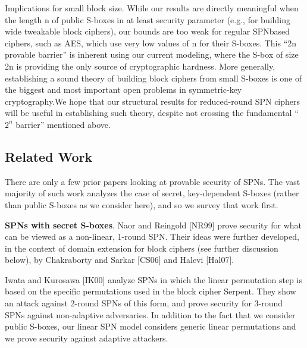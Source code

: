 Implications for small block size. While our results are directly meaningful
when the length n of public S-boxes in at least security parameter (e.g., for
building wide tweakable block ciphers), our bounds are too weak for regular SPNbased
ciphers, such as AES, which use very low values of n for their S-boxes.
This “2n provable barrier” is inherent using our current modeling, where the
S-box of size 2n is providing the only source of cryptographic hardness. More
generally, establishing a sound theory of building block ciphers from small S-boxes is one of the biggest and most important open problems in symmetric-key
cryptography.We hope that our structural results for reduced-round SPN ciphers
will be useful in establishing such theory, despite not crossing the fundamental
``$2^n$ barrier'' mentioned above.




%
%
%




\subsection{Related Work}


There are only a few prior papers looking at provable security of SPNs. The vast
majority of such work analyzes the case of secret, key-dependent S-boxes (rather
than public S-boxes as we consider here), and so we survey that work first.



{\bf SPNs with secret S-boxes}. Naor and Reingold [NR99] prove security for
what can be viewed as a non-linear, 1-round SPN. Their ideas were further
developed, in the context of domain extension for block ciphers (see further
discussion below), by Chakraborty and Sarkar [CS06] and Halevi [Hal07].


Iwata and Kurosawa [IK00] analyze SPNs in which the linear permutation
step is based on the specific permutations used in the block cipher Serpent. They
show an attack against 2-round SPNs of this form, and prove security for 3-round
SPNs against non-adaptive adversaries. In addition to the fact that we consider
public S-boxes, our linear SPN model considers generic linear permutations and
we prove security against adaptive attackers.

